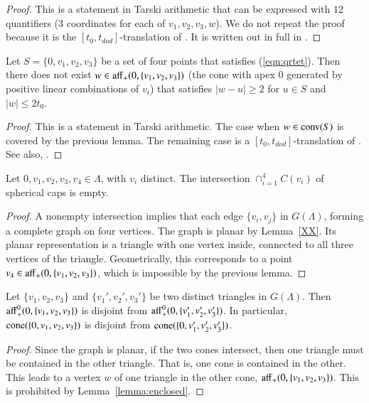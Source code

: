 \begin{proof}  This is a statement in Tarski arithmetic 
that can be expressed with $12$ quantifiers ($3$ coordinates
for each of $v_1,v_2,v_3,w$).  We do not repeat the proof
because it is the $[t_0,t_{dod}]$-translation of \cite[Lemma~4.15]{DCG}.
It is written out in full in \cite[Lemma~3.3]{arx}.
\end{proof}

\begin{lemma}\label{lemma:enclosed} 
Let $S=\{0,v_1,v_2,v_3\}$ be a set of four points
that satisfies (\ref{eqn:qrtet}).  Then
there does not exist $w\in{\operatorname{aff}}_+(0,\{v_1,v_2,v_3\})$
(the cone with apex $0$ 
generated by positive linear combinations of $v_i$) 
that satisfies $|w-u|\ge 2$ for 
$u\in S$ and $|w|\le 2t_0$.
\end{lemma}

\begin{proof} This is a statement in Tarski arithmetic.
The case when $w\in{\operatorname{conv}}(S)$ is covered by the previous lemma.
The remaining case is a $[t_0,t_{dod}]$-translation of
\cite[Lemma~4.19]{DCG}.  See also,  \cite[Cor~3.7]{arx}.
\end{proof}

\begin{lemma}  Let $0,v_1,v_2,v_3,v_4\in\Lambda$, with
$v_i$ distinct.  The intersection $\cap_{i=1}^4 C(v_i)$
of spherical caps is empty.
\end{lemma}

\begin{proof}  A nonempty intersection implies that each
edge $\{v_i,v_j\}$ in  $G(\Lambda)$, forming a complete graph
on four vertices.  The graph is planar by Lemma~\ref{XX}.
Its planar representation is a triangle with one vertex inside,
connected to all three vertices of the triangle.
Geometrically, this corresponds to a point $v_4\in{\operatorname{aff}}_+(0,\{v_1,v_2,v_3\})$, which is impossible by the previous lemma.
\end{proof}

\begin{lemma}  Let $\{v_1,v_2,v_3\}$ and $\{v_1',v_2',v_3'\}$
be two distinct triangles in $G(\Lambda)$.  Then
${\operatorname{aff}}_+^0(0,\{v_1,v_2,v_3\})$ is disjoint from
${\operatorname{aff}}_+^0(0,\{v_1',v_2',v_3'\})$.  In particular,
${\operatorname{cone}}(\{0,v_1,v_2,v_3\})$ is disjoint from
${\operatorname{cone}}(\{0,v_1',v_2',v_3'\})$.
\end{lemma}

\begin{proof} Since the graph is planar, if the two cones
intersect, then one triangle must be contained in the other
triangle.  That is, one cone is contained in the other.  This
leads to a vertex $w$ of one triangle in the other
cone, ${\operatorname{aff}}_+(0,\{v_1,v_2,v_3\})$.  This is prohibited
by Lemma~\ref{lemma:enclosed}.
\end{proof}

